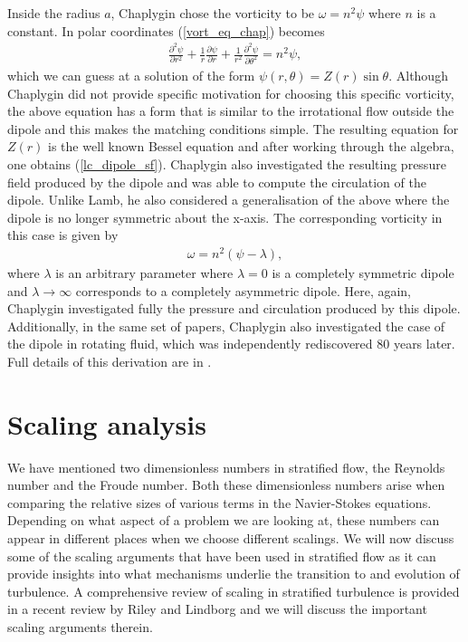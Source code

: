 Inside the radius $a$, Chaplygin chose the vorticity to be $\omega = n^{2}\psi$ where $n$ is a constant. In polar coordinates (\ref{vort_eq_chap}) becomes
\begin{align}
\frac{\partial^{2}\psi}{\partial r^{2}} + \frac{1}{r}\frac{\partial \psi}{\partial r} + \frac{1}{r^{2}}\frac{\partial^{2}\psi}{\partial \theta^{2}} =  n^{2}\psi,
\end{align}
which we can guess at a solution of the form $\psi(r,\theta) = Z(r)\sin\theta$. Although Chaplygin did not provide specific motivation for choosing this specific vorticity, the above equation has a form that is similar to the irrotational flow outside the dipole and this makes the matching conditions simple. The resulting equation for $Z(r)$ is the well known Bessel equation \cite{meleshko1994} and after working through the algebra, one obtains (\ref{lc_dipole_sf}). Chaplygin also investigated the resulting pressure field produced by the dipole and was able to compute the circulation of the dipole. Unlike Lamb, he also considered a generalisation of the above where the dipole is no longer symmetric about the x-axis. The corresponding vorticity in this case is given by
\begin{align}
\omega = n^{2}(\psi - \lambda),
\end{align}
where $\lambda$ is an arbitrary parameter where $\lambda=0$ is a completely symmetric dipole and $\lambda\rightarrow\infty$ corresponds to a completely asymmetric dipole. Here, again, Chaplygin investigated fully the pressure and circulation produced by this dipole. Additionally, in the same set of papers, Chaplygin also investigated the case of the dipole in rotating fluid, which was independently rediscovered 80 years later. Full details of this derivation are in \cite{meleshko1994}.


\section{Scaling analysis}
We have mentioned two dimensionless numbers in stratified flow, the Reynolds number and the Froude number. Both these dimensionless numbers arise when comparing the relative sizes of various terms in the Navier-Stokes equations. Depending on what aspect of a problem we are looking at, these numbers can appear in different places when we choose different scalings. We will now discuss some of the scaling arguments that have been used in stratified flow as it can provide insights into what mechanisms underlie the transition to and evolution of turbulence. A comprehensive review of scaling in stratified turbulence is provided in a recent review by Riley and Lindborg \cite{rileylindborg2013} and we will discuss the important scaling arguments therein. 

